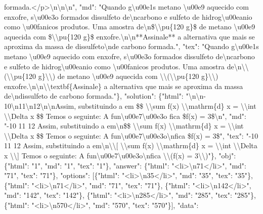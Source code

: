 formada.</p>\textbackslash{}n\textbackslash{}n\textbackslash{}n", "md": "Quando g\textbackslash{}u00e1s metano \textbackslash{}u00e9 aquecido com enxofre, s\textbackslash{}u00e3o formados dissulfeto de\textbackslash{}ncarbono e sulfeto de hidrog\textbackslash{}u00eanio como \textbackslash{}u00fanicos produtos. Uma amostra de\textbackslash{}n\$\textbackslash{}\textbackslash{}pu\{120 g\}\$ de metano \textbackslash{}u00e9 aquecida com \$\textbackslash{}\textbackslash{}pu\{120 g\}\$ enxofre.\textbackslash{}n\textbackslash{}n**Assinale** a alternativa que mais se aproxima da massa de dissulfeto\textbackslash{}nde carbono formada.", "tex": "Quando g\textbackslash{}u00e1s metano \textbackslash{}u00e9 aquecido com enxofre, s\textbackslash{}u00e3o formados dissulfeto de\textbackslash{}ncarbono e sulfeto de hidrog\textbackslash{}u00eanio como \textbackslash{}u00fanicos produtos. Uma amostra de\textbackslash{}n\textbackslash{}\textbackslash{}(\textbackslash{}\textbackslash{}pu\{120 g\}\textbackslash{}\textbackslash{}) de metano \textbackslash{}u00e9 aquecida com \textbackslash{}\textbackslash{}(\textbackslash{}\textbackslash{}pu\{120 g\}\textbackslash{}\textbackslash{}) enxofre.\textbackslash{}n\textbackslash{}n\textbackslash{}\textbackslash{}textbf\{Assinale\} a alternativa que mais se aproxima da massa de\textbackslash{}ndissulfeto de carbono formada."\}, "solution": \{"html": "\textbackslash{}n\textbackslash{}n{-}10\textbackslash{}n11\textbackslash{}n12\textbackslash{}n\textbackslash{}nAssim, substituindo a em \$\$ \textbackslash{}\textbackslash{}sum f(x) \textbackslash{}\textbackslash{}mathrm\{d\} x = \textbackslash{}\textbackslash{}int \textbackslash{}\textbackslash{}Delta x \$\$ Temos o seguinte: A fun\textbackslash{}u00e7\textbackslash{}u00e3o fica \$f(x) = 3\$\textbackslash{}n", "md": "{-}10 11 12 Assim, substituindo a em\textbackslash{}n\$\$ \textbackslash{}\textbackslash{}sum f(x) \textbackslash{}\textbackslash{}mathrm\{d\} x = \textbackslash{}\textbackslash{}int \textbackslash{}\textbackslash{}Delta x \$\$ Temos o seguinte: A fun\textbackslash{}u00e7\textbackslash{}u00e3o\textbackslash{}nfica \$f(x) = 3\$", "tex": "{-}10 11 12 Assim, substituindo a em\textbackslash{}n\textbackslash{}\textbackslash{}{[} \textbackslash{}\textbackslash{}sum f(x) \textbackslash{}\textbackslash{}mathrm\{d\} x = \textbackslash{}\textbackslash{}int \textbackslash{}\textbackslash{}Delta x \textbackslash{}\textbackslash{}{]} Temos o seguinte: A fun\textbackslash{}u00e7\textbackslash{}u00e3o\textbackslash{}nfica \textbackslash{}\textbackslash{}(f(x) = 3\textbackslash{}\textbackslash{})"\}, "obj": \{"html": "1", "md": "1", "tex": "1"\}, "answer": \{"html": "<li>\textbackslash{}n71</li>", "md": "71", "tex": "71"\}, "options": {[}\{"html": "<li>\textbackslash{}n35</li>", "md": "35", "tex": "35"\}, \{"html": "<li>\textbackslash{}n71</li>", "md": "71", "tex": "71"\}, \{"html": "<li>\textbackslash{}n142</li>", "md": "142", "tex": "142"\}, \{"html": "<li>\textbackslash{}n285</li>", "md": "285", "tex": "285"\}, \{"html": "<li>\textbackslash{}n570</li>", "md": "570", "tex": "570"\}{]}, "data": 
